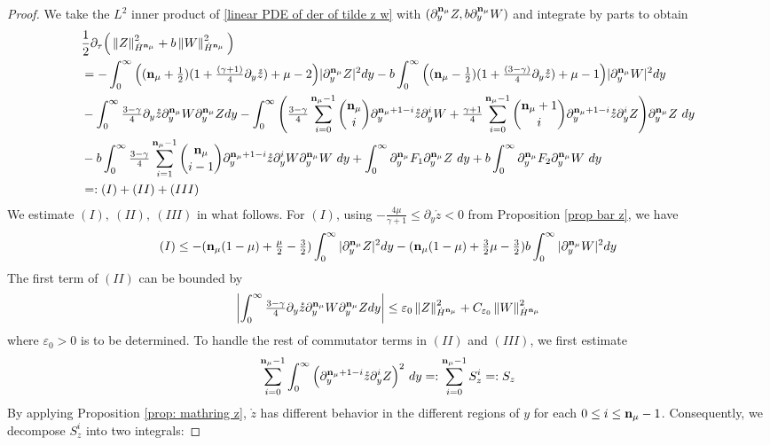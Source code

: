 \documentclass{article}
\newcommand{\norm}[1]{\left\lVert#1\right\rVert}
\newcommand{\ga}{\gamma}
\newcommand{\pa}{\partial}
\newcommand\eps{\varepsilon}
\def\espz{Z}
\def\espw{W}
\def\ndmu{{\bf{n}_{\mu}}}
\numberwithin{equation}{section}
\begin{document}
\begin{proof}
 We take the $L^2$ inner product of \eqref{linear PDE of der of tilde z w} with $(\pa_y^\ndmu \espz, b  \pa_y^\ndmu \espw )$ and integrate by parts to obtain 
 \begin{align*}
 	&\frac12\pa_\tau \Big( \norm{\espz}_{\dot H^{\ndmu}}^2+ b \norm{\espw}_{\dot H^{\ndmu}}^2 \Big)\\
	&= -\int_0^\infty \Big((\ndmu+\tfrac12) (1+\tfrac{(\ga+1)}{4}\partial_y \mathring z)+\mu- 2 \Big) |\pa_y^{\ndmu} \espz|^2  dy -b \int_0^\infty \Big((\ndmu-\tfrac12)(1+\tfrac{(3-\ga)}{4}\partial_y\mathring z) +\mu- 1 \Big) | \pa_y^{\ndmu} \espw|^2  dy   \\
	&- \int_0^\infty \tfrac{3-\gamma}{4} \pa_y \mathring z \pa_y^\ndmu \espw \pa_y^\ndmu \espz dy  - \int_0^\infty \Bigg( \tfrac{3-\ga}{4} \sum_{i=0}^{\ndmu-1}\binom{\ndmu}{i}\partial_y^{\ndmu+1-i} \mathring z  \pa_y^i \espw  +\tfrac{\ga+1}{4}\sum_{i=0}^{\ndmu-1} \binom{\ndmu+1}{i} \pa_y^{\ndmu+1-i} \mathring z \pa_y^i \espz  
    \Bigg)\pa_y^{\ndmu} \espz \ dy  \\
	&-b \int_0^\infty \tfrac{3-\ga}{4}\sum_{i=1}^{\ndmu-1} \binom{\ndmu}{i-1} \pa_y^{\ndmu+1-i} \mathring z \pa_y^{i} \espw \pa_y^{\ndmu} \espw \ dy +\int_0^\infty \pa_y^\ndmu F_1  \pa_y^\ndmu\espz \ dy +b \int_0^\infty \pa_y^\ndmu F_2  \pa_y^\ndmu\espw \ dy \\
    &=: (I) + (II) + (III)
\end{align*}
We estimate $(I), \ (II), \ (III)$ in what follows. For $(I)$, using $-\frac{4\mu}{\ga+1} \le\pa_y \mathring z < 0$ from Proposition \ref{prop bar z}, we have  
\begin{align*}
(I) \le - (\ndmu (1-\mu) + \tfrac{\mu}{2} - \tfrac32) \int_0^\infty |\pa_y^\ndmu \espz|^2 dy 
-  ( \ndmu(1- \mu) + \tfrac32 
\mu  -\tfrac32 ) b \int_0^\infty |\pa_y^\ndmu \espw|^2 dy
\end{align*}
The first term of $(II)$ can be bounded by 
\[
\left| \int_0^\infty \tfrac{3-\gamma}{4} \pa_y \mathring z \pa_y^\ndmu \espw \pa_y^\ndmu \espz dy \right| \le \eps_0  \norm{\espz}_{\dot H^{\ndmu}}^2 + C_{\eps_0} \norm{\espw}_{\dot H^{\ndmu}}^2
\]
where $\eps_0>0$ is to be determined. 
To handle the rest of commutator terms in $(II)$ and $(III)$, we first estimate   
\begin{align*}
    \sum_{i=0}^{\ndmu-1}{\int_0^\infty\Big( \pa_y^{\ndmu+1-i} \mathring z \pa_y^i \espz\Big)^2 \ dy} =:  {\sum_{i=0}^{\ndmu-1} S_z^i} =: S_z 
 \end{align*}
By applying Proposition \ref{prop: mathring z}, $\mathring z$ has different behavior in the different regions of $y$ for each $0\le i\le \ndmu-1$. Consequently, we decompose $S_z^i$ into two integrals: 

\end{proof}
\end{document}
